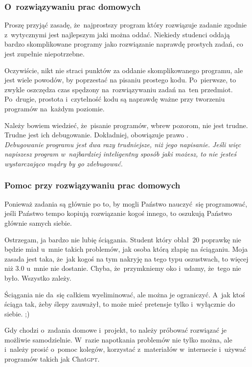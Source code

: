 \documentclass[10pt,t]{beamer}
\begin{document}
\begin{frame}
  \frametitle{O~rozwiązywaniu prac domowych}


  Proszę przyjąć zasadę, że~\alert{najprostszy program} który rozwiązuje
  zadanie zgodnie z~wytycznymi jest najlepszym jaki można oddać. Niekiedy
  studenci oddają bardzo skomplikowane programy jako rozwiązanie naprawdę
  prostych zadań, co jest zupełnie niepotrzebne.

  Oczywiście, nikt nie straci punktów za oddanie skomplikowanego programu,
  ale jest wiele powodów, by poprzestać na pisaniu prostego kodu.
  Po~pierwsze, to zwykle oszczędza czas spędzony na~rozwiązywaniu zadań
  na~ten przedmiot. Po~drugie, prostota i~czytelność kodu są naprawdę ważne
  przy tworzeniu programów na~każdym poziomie.

  Należy bowiem wiedzieć, że~pisanie programów, wbrew pozorom,
  \alert{nie} jest trudne. \alert{Trudne jest ich debugowanie.}
  Dokładniej, obowiązuje prawo
  . \\
  \textit{Debugowanie programu jest dwa razy trudniejsze, niż jego
    napisanie. Jeśli więc napiszesz program w~najbardziej inteligentny
    sposób jaki możesz, to nie jesteś wystarczająco mądry by go
    zdebugować.}

\end{frame}





\begin{frame}
  \frametitle{Pomoc przy rozwiązywaniu prac domowych}


  Ponieważ zadania są głównie po to, by mogli Państwo nauczyć~się
  programować, jeśli Państwo tempo kopiują rozwiązanie kogoś innego,
  to oszukują Państwo głównie samych siebie.

  Ostrzegam, ja bardzo \alert{nie lubię} ściągania. Student który
  oblał~$20$ poprawkę nie będzie miał u~mnie takich problemów, jak osoba
  którą złapię na ściąganiu. Moja zasada jest taka, że~jak kogoś na tym
  nakryję na tego typu oszustwach, to więcej niż $3.0$ u~mnie
  \alert{nie dostanie}. Chyba, że~przymkniemy oko i~udamy, że~tego nie było.
  Wszystko zależy.

  Ściągania nie da~się całkiem wyeliminować, ale można je ograniczyć.
  A~jak ktoś ściąga tak, żeby ślepy zauważył, to może mieć pretensje tylko
  i~wyłącznie do siebie. ;)

  Gdy chodzi o~zadania domowe i~projekt, to należy próbować rozwiązać je
  możliwie samodzielnie. W~razie napotkania problemów nie tylko można,
  ale i~\alert{należy} prosić o~pomoc kolegów, korzystać z~materiałów
  w~internecie i~używać programów takich jak Chat\textsc{gpt}.

\end{frame}
\end{document}
